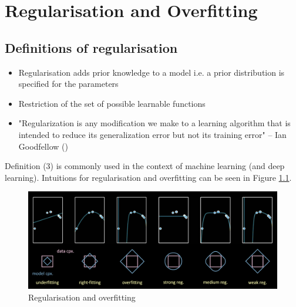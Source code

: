 \chapter{Regularisation and Overfitting}

\section{Definitions of regularisation}
\begin{itemize}
    \item[(1)] Regularisation adds prior knowledge to a model i.e. a prior distribution is specified for the parameters
    \item[(2)] Restriction of the set of possible learnable functions
    \item[(3)] "Regularization is any modification we make to a learning algorithm that is intended to reduce its generalization error but not its training error" -- Ian Goodfellow (\cite{Goodfellow-et-al-2016})
\end{itemize}

Definition (3) is commonly used in the context of machine learning (and deep learning).
Intuitions for regularisation and overfitting can be seen in Figure \ref{fig:reg_n_overfitting}.

\begin{figure}
    \centering
    \includegraphics[scale=0.5]{labs/08/images/regularisation_and_overfitting.PNG}
    \caption{Regularisation and overfitting}
    \label{fig:reg_n_overfitting}
\end{figure}


